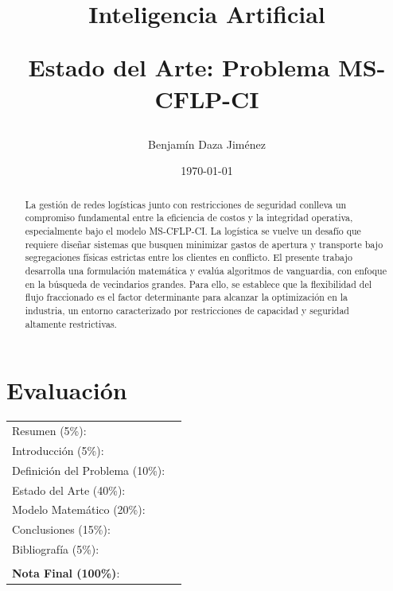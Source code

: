 \documentclass[letter, 10pt]{article}
\begin{document}
\title{Inteligencia Artificial \\ \begin{Large}Estado del Arte: Problema MS-CFLP-CI\end{Large}}
\author{Benjamín Daza Jiménez}
\date{\today}
\maketitle


\section*{Evaluación}

\begin{tabular}{ll}
Resumen (5\%): & \underline{\hspace{2cm}} \\
Introducci\'on (5\%):  & \underline{\hspace{2cm}} \\
Definición del Problema (10\%):  & \underline{\hspace{2cm}} \\
Estado del Arte (40\%):  & \underline{\hspace{2cm}} \\
Modelo Matem\'atico (20\%): &  \underline{\hspace{2cm}}\\
Conclusiones (15\%): &  \underline{\hspace{2cm}}\\
Bibliograf\'ia (5\%): & \underline{\hspace{2cm}}\\
 &  \\
\textbf{Nota Final (100\%)}:   & \underline{\hspace{2cm}}
\end{tabular}
\vspace{2cm}


\begin{abstract}
La gestión de redes logísticas junto con restricciones de seguridad conlleva un compromiso fundamental entre la eficiencia de costos y la integridad operativa, especialmente bajo el modelo MS-CFLP-CI. La logística se vuelve un desafío que requiere diseñar sistemas que busquen minimizar gastos de apertura y transporte bajo segregaciones físicas estrictas entre los clientes en conflicto. El presente trabajo desarrolla una formulación matemática y evalúa algoritmos de vanguardia, con enfoque en la búsqueda de vecindarios grandes. Para ello, se establece que la flexibilidad del flujo fraccionado es el factor determinante para alcanzar la optimización en la industria, un entorno caracterizado por restricciones de capacidad y seguridad altamente restrictivas.
\end{abstract}
\end{document}
